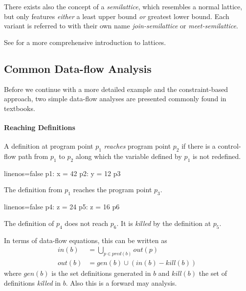 \documentclass[article]{uibk}
\begin{document}
There exists also the concept of a \textit{semilattice}, which resembles a
normal lattice, but only features \emph{either} a least upper bound \emph{or}
greatest lower bound. Each variant is referred to with their own name
\textit{join-semilattice} or \textit{meet-semilattice}.

See \cite{lattice_tutorial} for a more comprehensive introduction to lattices.

\subsection{Common Data-flow Analysis}

Before we continue with a more detailed example and the constraint-based
approach, two simple data-flow analyses are presented commonly found in
textbooks.

\paragraph{Reaching Definitions}

A definition at program point $p_1$ \textit{reaches} program point $p_2$ if there
is a control-flow path from $p_1$ to $p_2$ along which the variable defined by
$p_1$ is not redefined.~\cite{wiki:reaching_definition}

\begin{minipage}[t]{0.45\textwidth}
    \begin{code*}{linenos=false}
        p1: x = 42
        p2: y = 12
        p3
    \end{code*}

    The definition from $p_1$ reaches the program point $p_3$.
\end{minipage}\hfill
\begin{minipage}[t]{0.45\textwidth}
    \begin{code*}{linenos=false}
        p4: z = 24
        p5: z = 16
        p6
    \end{code*}

    The definition of $p_4$ does not reach $p_6$. It is \textit{killed} by the
    definition at $p_5$.
\end{minipage}
\vspace{2em}

In terms of data-flow equations, this can be written as
%
\begin{align*}
    in(b)  &= \bigcup_{p \in pred(b)} out(p) \\
    out(b) &= gen(b) \cup (in(b) - kill(b))
\end{align*}
%
where $gen(b)$ is the set definitions generated in $b$ and $kill(b)$ the set of
definitions \textit{killed} in $b$. Also this is a forward may analysis.
\end{document}
